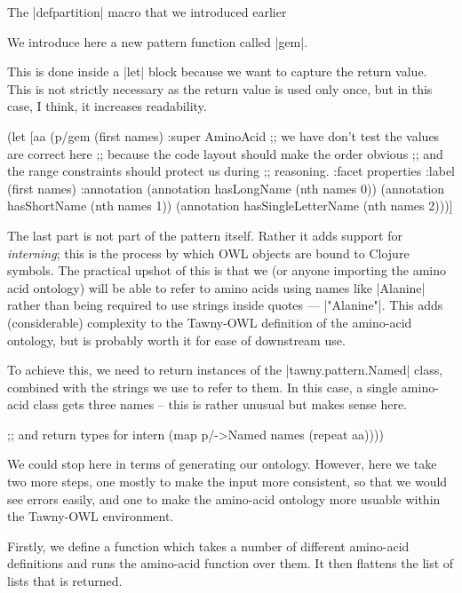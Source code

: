The |defpartition| macro that we introduced earlier 

We introduce here a new pattern function called |gem|.

 This is done inside a |let| block because we want to capture the return
value. This is not strictly necessary as the return value is used only once,
but in this case, I think, it increases readability.

\begin{tawny}
  (let [aa (p/gem (first names)
                :super AminoAcid
                ;; we have don't test the values are correct here
                ;; because the code layout should make the order obvious
                ;; and the range constraints should protect us during
                ;; reasoning.
                :facet properties
                :label (first names)
                :annotation
                (annotation hasLongName (nth names 0))
                (annotation hasShortName (nth names 1))
                (annotation hasSingleLetterName (nth names 2)))]
\end{tawny}

The last part is not part of the pattern itself. Rather it adds support for
\emph{interning}; this is the process by which OWL objects are bound to
Clojure symbols. The practical upshot of this is that we (or anyone importing
the amino acid ontology) will be able to refer to amino acids using names like
|Alanine| rather than being required to use strings inside quotes ---
|"Alanine"|. This adds (considerable) complexity to the Tawny-OWL definition
of the amino-acid ontology, but is probably worth it for ease of downstream
use.

To achieve this, we need to return instances of the |tawny.pattern.Named|
class, combined with the strings we use to refer to them. In this case, a
single amino-acid class gets three names -- this is rather unusual but makes
sense here.

\begin{tawny}
    ;; and return types for intern
    (map p/->Named
         names
         (repeat aa))))
\end{tawny}

We could stop here in terms of generating our ontology. However, here we take
two more steps, one mostly to make the input more consistent, so that we would
see errors easily, and one to make the amino-acid ontology more usuable within
the Tawny-OWL environment.

Firstly, we define a function which takes a number of different amino-acid
definitions and runs the amino-acid function over them. It then flattens the
list of lists that is returned.

